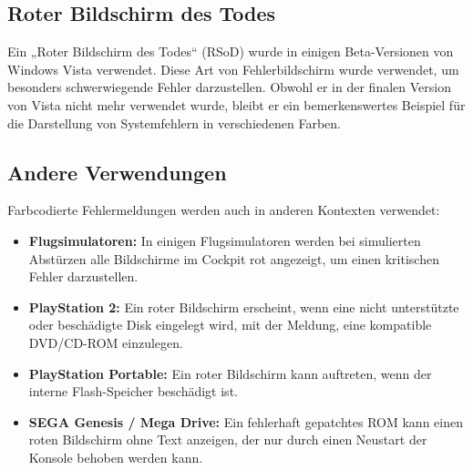 \documentclass[paper=a4,fontsize=12pt,ngerman,parskip=half]{scrartcl}
\begin{document}
\subsection{Roter Bildschirm des Todes}

Ein „Roter Bildschirm des Todes“ (RSoD) wurde in einigen Beta-Versionen von Windows Vista verwendet. Diese Art von Fehlerbildschirm wurde verwendet, um besonders schwerwiegende Fehler darzustellen. Obwohl er in der finalen Version von Vista nicht mehr verwendet wurde, bleibt er ein bemerkenswertes Beispiel für die Darstellung von Systemfehlern in verschiedenen Farben.

\subsection{Andere Verwendungen}

Farbcodierte Fehlermeldungen werden auch in anderen Kontexten verwendet:
\begin{itemize}
  \item \textbf{Flugsimulatoren:} In einigen Flugsimulatoren werden bei simulierten Abstürzen alle Bildschirme im Cockpit rot angezeigt, um einen kritischen Fehler darzustellen.
  \item \textbf{PlayStation 2:} Ein roter Bildschirm erscheint, wenn eine nicht unterstützte oder beschädigte Disk eingelegt wird, mit der Meldung, eine kompatible DVD/CD-ROM einzulegen.\cite{wikipedia}
  \item \textbf{PlayStation Portable:} Ein roter Bildschirm kann auftreten, wenn der interne Flash-Speicher beschädigt ist.
  \item \textbf{SEGA Genesis / Mega Drive:} Ein fehlerhaft gepatchtes ROM kann einen roten Bildschirm ohne Text anzeigen, der nur durch einen Neustart der Konsole behoben werden kann.
\end{itemize}

\pagebreak
\end{document}
